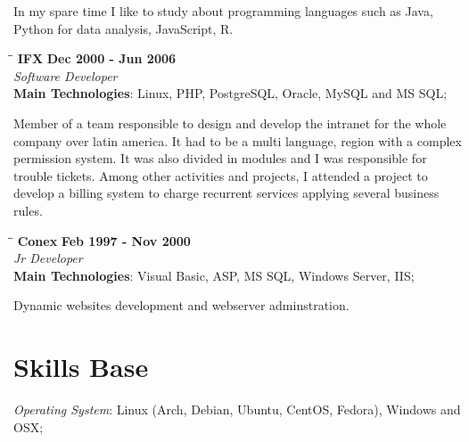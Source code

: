 \documentclass[margin]{res}
\begin{document}
\begin{resume}
In my spare time I like to study about programming languages such as Java, Python for data analysis, JavaScript, R.

\vspace{-0.1in}

\vspace{-0.1in}
   \begin{tabbing}
   \hspace{2.3in}\= \hspace{1.7in}\= \kill %
    \textbf{IFX}    \>\>\textbf{Dec 2000 - Jun 2006}\\
    \textit{Software Developer}\\        
    \textbf{Main Technologies}: Linux, PHP, PostgreSQL, Oracle, MySQL and MS SQL;
   \end{tabbing}\vspace{-20pt}      %
    \vspace{2mm}
        Member of a team responsible to design and develop the intranet for the whole company over latin america. 
        It had to be a multi language, region with a complex permission system. It was also divided in modules and I was responsible for trouble tickets.
        Among other activities and projects, I attended a project to develop a billing system to charge recurrent services applying several business rules.
\vspace{-0.1in}

   \begin{tabbing}
   \hspace{2.3in}\= \hspace{1.7in}\= \kill %
    \textbf{Conex}    \>\>\textbf{Feb 1997 - Nov 2000}\\
    \textit{Jr Developer}\\        
    \textbf{Main Technologies}: Visual Basic, ASP, MS SQL, Windows Server, IIS;
   \end{tabbing}\vspace{-20pt}      %
    \vspace{2mm}
      Dynamic websites development and webserver adminstration.  

\section{Skills Base}  \textit{Operating System}:  Linux (Arch, Debian, Ubuntu, CentOS, Fedora), Windows and OSX;


\end{resume}
\end{document}

